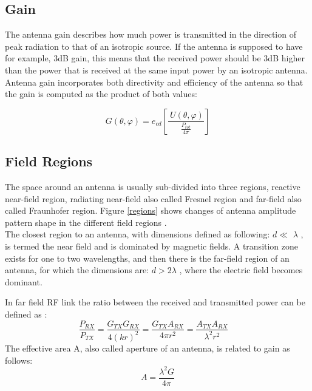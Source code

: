 \subsection{Gain}
The antenna gain describes how much power is transmitted in the direction of peak radiation to that of an isotropic source. If the antenna is supposed to have for example, 3dB gain, this means that the received power should be 3dB higher than the power that is received at the same input power by an isotropic antenna. Antenna gain incorporates both directivity and efficiency of the antenna so that the gain is computed as the product of both values: 

\begin{equation}
G \left(  \theta , \varphi  \right) =e_{cd} \left[ \frac{~U \left(  \theta , \varphi  \right) }{\frac{P_{tot}}{4 \pi }} \right]
\end{equation}



\subsection{Field Regions}
The space around an antenna is usually sub-divided into three regions, reactive near-field region, radiating near-field also called Fresnel region and far-field also called Fraunhofer region. Figure \ref{regions} shows changes of antenna amplitude pattern shape in the different field regions \cite{7942128}. \\

The closest region to an antenna, with dimensions defined as following: $d \ll $ $ \lambda $  , is termed the near field and is dominated by magnetic fields. A transition zone exists for one to two wavelengths, and then there is the far-field region of an antenna, for which the dimensions are: $d>2\lambda $  , where the electric field becomes dominant.

In far field \acs{RF} link the ratio between the received and transmitted power can be defined as \cite{schantz}:
\begin{equation}
\frac{P_{RX}}{P_{TX}}=\frac{G_{TX}G_{RX}}{4 \left( kr \right) ^{2}}=\frac{G_{TX}A_{RX}}{4 \pi r^{2}}=\frac{A_{TX}A_{RX}}{ \lambda ^{2}r^{2}} \quad %
\end{equation}
The effective area A, also called aperture of an antenna, is related to gain as follows: 
\begin{equation}
A=\frac{ \lambda ^{2}G}{4 \pi }
\end{equation}

